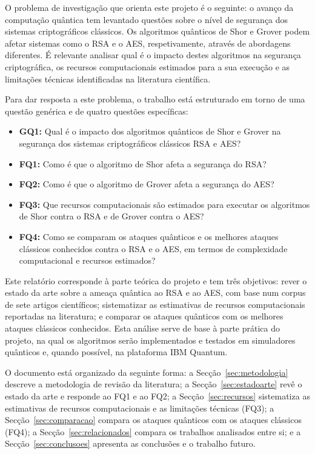 \documentclass[11pt,a4paper]{article}
\begin{document}
O problema de investigação que orienta este projeto é o seguinte: o avanço da computação quântica tem levantado questões sobre o nível de segurança dos sistemas criptográficos clássicos. Os algoritmos quânticos de Shor e Grover podem afetar sistemas como o RSA e o AES, respetivamente, através de abordagens diferentes. É relevante analisar qual é o impacto destes algoritmos na segurança criptográfica, os recursos computacionais estimados para a sua execução e as limitações técnicas identificadas na literatura científica.

Para dar resposta a este problema, o trabalho está estruturado em torno de uma questão genérica e de quatro questões específicas:

\begin{itemize}
\item \textbf{GQ1:} Qual é o impacto dos algoritmos quânticos de Shor e Grover na segurança dos sistemas criptográficos clássicos RSA e AES?
\item \textbf{FQ1:} Como é que o algoritmo de Shor afeta a segurança do RSA?
\item \textbf{FQ2:} Como é que o algoritmo de Grover afeta a segurança do AES?
\item \textbf{FQ3:} Que recursos computacionais são estimados para executar os algoritmos de Shor contra o RSA e de Grover contra o AES?
\item \textbf{FQ4:} Como se comparam os ataques quânticos e os melhores ataques clássicos conhecidos contra o RSA e o AES, em termos de complexidade computacional e recursos estimados?
\end{itemize}

Este relatório corresponde à parte teórica do projeto e tem três objetivos: rever o estado da arte sobre a ameaça quântica ao RSA e ao AES, com base num corpus de sete artigos científicos; sistematizar as estimativas de recursos computacionais reportadas na literatura; e comparar os ataques quânticos com os melhores ataques clássicos conhecidos. Esta análise serve de base à parte prática do projeto, na qual os algoritmos serão implementados e testados em simuladores quânticos e, quando possível, na plataforma IBM Quantum.

O documento está organizado da seguinte forma: a Secção~\ref{sec:metodologia} descreve a metodologia de revisão da literatura; a Secção~\ref{sec:estadoarte} revê o estado da arte e responde ao FQ1 e ao FQ2; a Secção~\ref{sec:recursos} sistematiza as estimativas de recursos computacionais e as limitações técnicas (FQ3); a Secção~\ref{sec:comparacao} compara os ataques quânticos com os ataques clássicos (FQ4); a Secção~\ref{sec:relacionados} compara os trabalhos analisados entre si; e a Secção~\ref{sec:conclusoes} apresenta as conclusões e o trabalho futuro.
\end{document}
